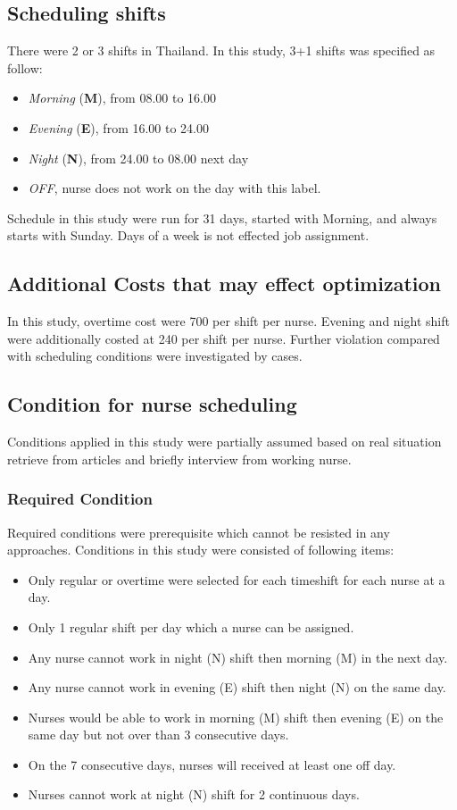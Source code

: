 \documentclass[conference]{IEEEtran}
\begin{document}
\subsection{Scheduling shifts}
There were 2 or 3 shifts in Thailand. In this study, 3+1 shifts was specified as follow:
\begin{itemize}
	\item \textit{Morning} (\textbf{M}), from 08.00 to 16.00
	\item \textit{Evening} (\textbf{E}), from 16.00 to 24.00
	\item \textit{Night} (\textbf{N}), from 24.00 to 08.00 next day
	\item \textit{OFF}, nurse does not work on the day with this label.
\end{itemize}
Schedule in this study were run for 31 days, started with Morning, and always starts with Sunday. Days of a week is not effected job assignment.

\subsection{Additional Costs that may effect optimization}
In this study, overtime cost were 700 per shift per nurse. Evening and night shift were additionally costed at 240 per shift per nurse. Further violation compared with scheduling conditions were investigated by cases.

\subsection{Condition for nurse scheduling}
Conditions applied in this study were partially assumed based on real situation retrieve from articles \cite{Thongsopa_Janjarassuk_2021,Ratee2019_nursescheduling} and briefly interview from working nurse.

\subsubsection{Required Condition}
Required conditions were prerequisite which cannot be resisted in any approaches. Conditions in this study were consisted of following items:
\begin{itemize}
	\item Only regular or overtime were selected for each timeshift for each nurse at a day.
	\item Only 1 regular shift per day which a nurse can be assigned.
	\item Any nurse cannot work in night (N) shift then morning (M) in the next day.
	\item Any nurse cannot work in evening (E) shift then night (N) on the same day.
	\item Nurses would be able to work in morning (M) shift then evening (E) on the same day but not over than 3 consecutive days.
	\item On the 7 consecutive days, nurses will received at least one off day.
	\item Nurses cannot work at night (N) shift for 2 continuous days.
\end{itemize}
\end{document}
